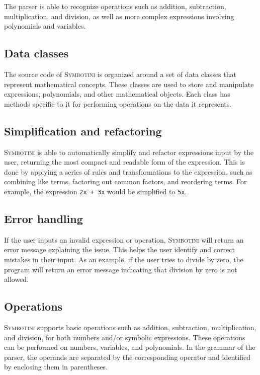 The parser is able to recognize operations such as addition, subtraction, multiplication, and division, as well as more complex expressions involving polynomials and variables.

\subsection{Data classes}\label{subsec:data-classes}

The source code of \textsc{Symbotini} is organized around a set of data classes that represent mathematical concepts. These classes are used to store and manipulate expressions, polynomials, and other mathematical objects. Each class has methods specific to it for performing operations on the data it represents.

\subsection{Simplification and refactoring}\label{subsec:simplification-refactoring}

\textsc{Symbotini} is able to automatically simplify and refactor expressions input by the user, returning the most compact and readable form of the expression. This is done by applying a series of rules and transformations to the expression, such as combining like terms, factoring out common factors, and reordering terms. For example, the expression \verb|2x + 3x| would be simplified to \verb|5x|.

\subsection{Error handling}\label{subsec:error-handling}

If the user inputs an invalid expression or operation, \textsc{Symbotini} will return an error message explaining the issue. This helps the user identify and correct mistakes in their input. As an example, if the user tries to divide by zero, the program will return an error message indicating that division by zero is not allowed.

\subsection{Operations}\label{subsec:arithmetic-operations}

\textsc{Symbotini} supports basic operations such as addition, subtraction, multiplication, and division, for both numbers and/or symbolic expressions. These operations can be performed on numbers, variables, and polynomials. In the grammar of the parser, the operands are separated by the corresponding operator and identified by enclosing them in parentheses.

